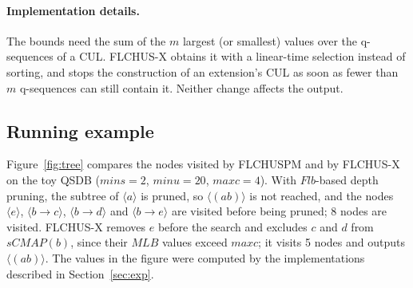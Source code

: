 \documentclass[pdflatex,sn-mathphys,Numbered]{sn-jnl}
\theoremstyle{thmstyleone}
\theoremstyle{thmstyletwo}
\theoremstyle{thmstylethree}
\newcommand{\FL}{\textsc{FLCHUSPM}}
\newcommand{\FX}{\textsc{FLCHUS-X}}
\newcommand{\flb}{\ensuremath{\mathit{Flb}}}
\newcommand{\mlb}{\ensuremath{\mathit{MLB}}}
\newcommand{\minu}{\ensuremath{\mathit{minu}}}
\newcommand{\maxc}{\ensuremath{\mathit{maxc}}}
\newcommand{\mins}{\ensuremath{\mathit{mins}}}
\newcommand{\seq}[1]{\langle #1\rangle}
\begin{document}
\paragraph{Implementation details.} The bounds need the sum of the $m$ largest (or smallest)
values over the q-sequences of a CUL. \FX{} obtains it with a linear-time selection instead of
sorting, and stops the construction of an extension's CUL as soon as fewer than $m$ q-sequences
can still contain it. Neither change affects the output.

\subsection{Running example}

Figure~\ref{fig:tree} compares the nodes visited by \FL{} and by \FX{} on the toy QSDB
($\mins = 2$, $\minu = 20$, $\maxc = 4$). With \flb-based depth pruning, the subtree of
$\seq{a}$ is pruned, so $\seq{(ab)}$ is not reached, and the nodes $\seq{e}$, $\seq{b \to c}$,
$\seq{b \to d}$ and $\seq{b \to e}$ are visited before being pruned; 8 nodes are visited. \FX{}
removes $e$ before the search and excludes $c$ and $d$ from $\mathit{sCMAP}(b)$, since their
\mlb{} values exceed \maxc; it visits 5 nodes and outputs $\seq{(ab)}$. The values in the figure
were computed by the implementations described in Section~\ref{sec:exp}.
\end{document}
